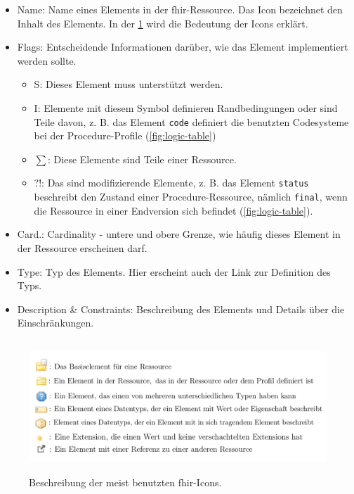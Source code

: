 \begin{itemize}
	\item Name: Name eines Elements in der \ac{fhir}-Ressource. Das Icon bezeichnet den Inhalt des Elements. In der \ref{fig:icons} wird die Bedeutung der Icons erklärt.
	\item Flags: Entscheidende Informationen darüber, wie das Element implementiert werden sollte.
	\begin{itemize}
		\item S: Dieses Element muss unterstützt werden.
		\item I: Elemente mit diesem Symbol definieren Randbedingungen oder sind Teile davon, z. B. das Element \texttt{code} definiert die benutzten Codesysteme bei der \glqq Procedure\grqq{}-Profile (\ref{fig:logic-table})
		\item $\sum$: Diese Elemente sind Teile einer Ressource.
		\item ?!: Das sind modifizierende Elemente, z. B. das Element \texttt{status} beschreibt den Zustand einer \glqq Procedure\grqq{}-Ressource, nämlich \texttt{final}, wenn die Ressource in einer Endversion sich befindet (\ref{fig:logic-table}).
	\end{itemize}
	\item Card.: Cardinality - untere und obere Grenze, wie häufig dieses Element in der Ressource erscheinen darf.
	\item Type: Typ des Elements. Hier erscheint auch der Link zur Definition des Typs.
	\item Description \& Constraints: Beschreibung des Elements und Details über die Einschränkungen.
\end{itemize}

\begin{figure}[ht]
	\centering
	\includegraphics[height=5cm]{figures/icons_description}
	\caption[Beschreibung der meist benutzten \acs{fhir}-Icons]{Beschreibung der meist benutzten \acs{fhir}-Icons.}
	\label{fig:icons}
\end{figure}


